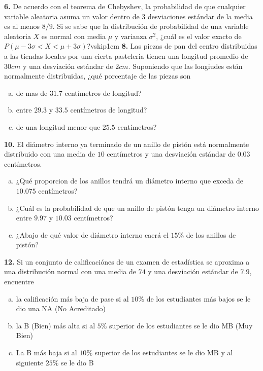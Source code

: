 \documentclass[12pt, letterpaper]{article}
\begin{document}
    \textbf{6. }De acuerdo con el teorema de Chebyshev, la probabilidad de que cualquier variable aleatoria asuma un valor
    dentro de 3 desviaciones estándar de la media es al menos $8/9$. Si se sabe que la distribución de probabilidad de
    una variable aleatoria $X$ es normal con media $\mu$ y varianza $\sigma ^2$, ¿cuál es el valor exacto de
    $P(\mu - 3\sigma <X<\mu + 3\sigma )$?vskip1cm
    \textbf{8. }Las piezas de pan del centro distribuidas a las tiendas locales por una cierta pasteleria tienen una
    longitud promedio de $30cm$ y una desviación estándar de $2cm$. Suponiendo que las longiudes  están normalmente
    distribuidas, ¿qué porcentaje de las piezas son
        \begin{enumerate}[a)]
            \item de mas de $31.7$ centímetros de longitud?
            \item entre $29.3$ y $33.5$ centímetros de longitud?
            \item de una longitud menor que $25.5$ centímetros?
        \end{enumerate}\vskip1cm

    \textbf{10. }El diámetro interno ya terminado de un anillo de pistón está normalmente distribuido con una media de $10$
    centímetros y una desviación estándar de $0.03$ centímetros.
        \begin{enumerate}[a)]
            \item ¿Qué proporcion de los anillos tendrá un diámetro interno que exceda de $10.075$ centímetros?
            \item ¿Cuál es la probabilidad de que un anillo de pistón tenga un diámetro interno entre $9.97$ y $10.03$
                    centímetros?
            \item ¿Abajo de qué valor de diámetro interno caerá el $15\%$ de los anillos de pistón?
        \end{enumerate}\vskip1cm

    \textbf{12. }Si un conjunto de calificaciónes de un examen de estadística se aproxima a una distribución normal con
    una media de $74$ y una desviación estándar de $7.9$, encuentre
        \begin{enumerate}[a)]
            \item la calificación más baja de pase si al $10\%$ de los estudiantes más bajos se le dio una NA (No Acreditado)
            \item la B (Bien) más alta si al $5\%$ superior de los estudiantes se le dio MB (Muy Bien)
            \item La B más baja si al $10\%$ superior de los estudiantes se le dio MB y al siguiente $25\%$ se le dio B
        \end{enumerate}\vskip1cm
\end{document}
